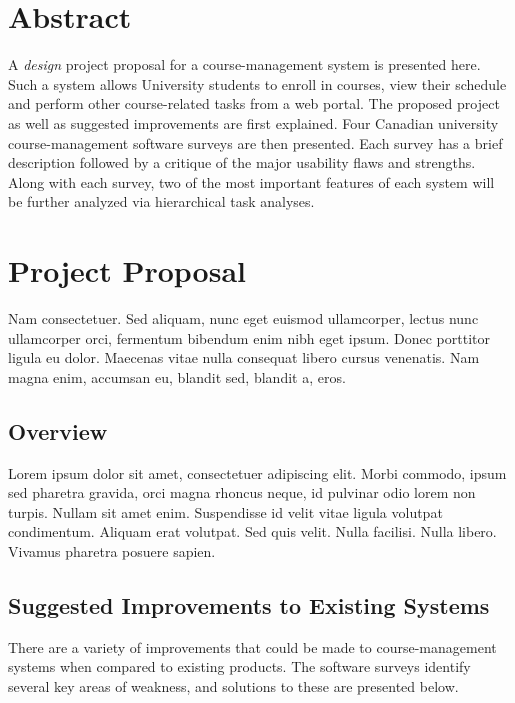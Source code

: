 \documentclass[10pt]{article}
\begin{document}
\begin{multicols}{2}

\section*{Abstract}
A \emph{design} project proposal for a course-management system is presented 
here. Such a system allows University students to enroll in courses, view their 
schedule and perform other course-related tasks from a web portal. The proposed 
project as well as suggested improvements are first explained. Four Canadian 
university course-management software surveys are then presented. Each survey 
has a brief description followed by a critique of the major usability flaws and 
strengths. Along with each survey, two of the most important features of each 
system will be further analyzed via hierarchical task analyses. 

\section*{Project Proposal}
Nam consectetuer. Sed aliquam, nunc eget euismod ullamcorper, lectus nunc 
ullamcorper orci, fermentum bibendum enim nibh eget ipsum. Donec porttitor 
ligula eu dolor. Maecenas vitae nulla consequat libero cursus venenatis. Nam 
magna enim, accumsan eu, blandit sed, blandit a, eros. 

\subsection*{Overview}
Lorem ipsum dolor sit amet, consectetuer adipiscing elit. Morbi commodo, ipsum 
sed pharetra gravida, orci magna rhoncus neque, id pulvinar odio lorem non 
turpis. Nullam sit amet enim. Suspendisse id velit vitae ligula volutpat 
condimentum. Aliquam erat volutpat. Sed quis velit. Nulla facilisi. Nulla 
libero. Vivamus pharetra posuere sapien. 

\subsection*{Suggested Improvements to Existing Systems}
There are a variety of improvements that could be made to course-management 
systems when compared to existing products. The software surveys identify 
several key areas of weakness, and solutions to these are presented below.\\


\end{multicols}
\end{document}
